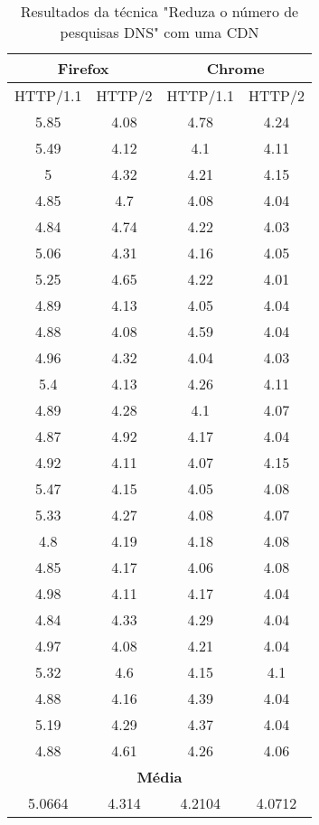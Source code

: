 \begin{table}[h]
	\centering
	\caption{Resultados da técnica "Reduza o número de pesquisas DNS" com uma CDN}
	\label{resultados-reduzaonumerodepesquisasdns-unica}
	\begin{tabular}{cccc}
		\hline
		\multicolumn{2}{c}{\textbf{Firefox}} & \multicolumn{2}{c}{\textbf{Chrome}} \\
		\hline
		HTTP/1.1 & HTTP/2 & HTTP/1.1 & HTTP/2 \\
		\hline
		5.85 & 4.08 & 4.78 & 4.24 \\
		5.49 & 4.12 & 4.1 & 4.11 \\
		5 & 4.32 & 4.21 & 4.15 \\
		4.85 & 4.7 & 4.08 & 4.04 \\
		4.84 & 4.74 & 4.22 & 4.03 \\
		5.06 & 4.31 & 4.16 & 4.05 \\
		5.25 & 4.65 & 4.22 & 4.01 \\
		4.89 & 4.13 & 4.05 & 4.04 \\
		4.88 & 4.08 & 4.59 & 4.04 \\
		4.96 & 4.32 & 4.04 & 4.03 \\
		5.4 & 4.13 & 4.26 & 4.11 \\
		4.89 & 4.28 & 4.1 & 4.07 \\
		4.87 & 4.92 & 4.17 & 4.04 \\
		4.92 & 4.11 & 4.07 & 4.15 \\
		5.47 & 4.15 & 4.05 & 4.08 \\
		5.33 & 4.27 & 4.08 & 4.07 \\
		4.8 & 4.19 & 4.18 & 4.08 \\ 
		4.85 & 4.17 & 4.06 & 4.08 \\
		4.98 & 4.11 & 4.17 & 4.04 \\
		4.84 & 4.33 & 4.29 & 4.04 \\
		4.97 & 4.08 & 4.21 & 4.04 \\
		5.32 & 4.6 & 4.15 & 4.1 \\
		4.88 & 4.16 & 4.39 & 4.04 \\
		5.19 & 4.29 & 4.37 & 4.04 \\
		4.88 & 4.61 & 4.26 & 4.06 \\
		\hline
		\multicolumn{4}{c}{\textbf{Média}} \\
		5.0664 & 4.314 & 4.2104 & 4.0712 \\
		\hline
	\end{tabular}
\end{table}
